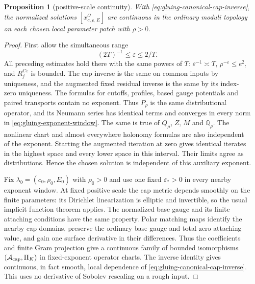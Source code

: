 \documentclass[11pt]{amsart}
\newtheorem{proposition}[theorem]{Proposition}
\theoremstyle{definition}
\theoremstyle{remark}
\theoremstyle{plain}
\begin{document}
\begin{proposition}[positive-scale continuity]\label{prop:gluing-parameter-continuity}
With \eqref{eq:gluing-canonical-cap-inverse}, the normalized solutions
$[x^{\mathcal O}_{c,\rho,E}]$ are continuous in the ordinary
moduli topology on each chosen local parameter patch with $\rho>0$.
\end{proposition}

\begin{proof}
First allow the simultaneous range
\begin{equation}\label{eq:gluing-exponent-window}
                      (2T)^{-1}\leq\varepsilon\leq2/T.
\end{equation}
All preceding estimates hold there with the same powers of $T$:
$\varepsilon^{-1}\asymp T$, $\rho^{-\varepsilon}\leq e^2$,
and $R_j^{C\varepsilon}$ is bounded. The cap inverse is the
same on common inputs by uniqueness, and the augmented fixed residual
inverse is the same by its index-zero uniqueness. The formulas for
cutoffs, profiles, based gauge potentials and paired transports contain
no exponent. Thus $P_\rho$ is the same distributional operator,
and its Neumann series has identical terms and converges in every
norm in \eqref{eq:gluing-exponent-window}. The same is true of
$Q_\rho$, $Z$, $M$ and $\mathbb Q_\rho$. The nonlinear
chart and almost everywhere holonomy formulas are also independent
of the exponent. Starting the augmented iteration at zero gives
identical iterates in the highest space and every lower space in
this interval. Their limits agree as distributions. Hence the chosen
solution is independent of this auxiliary exponent.

Fix $\lambda_0=(c_0,\rho_0,E_0)$ with $\rho_0>0$ and use
one fixed $\varepsilon_*>0$ in every nearby exponent window.
At fixed positive scale the cap metric depends smoothly on the finite
parameters: its Dirichlet linearization is elliptic and invertible,
so the usual implicit function theorem applies. The normalized base
gauge and its finite attaching conditions have the same property.
Polar matching maps identify the nearby cap domains, preserve the
ordinary base gauge and total zero attaching value, and gain one
surface derivative in their differences. Thus the coefficients and
finite Gram projection give a continuous family of bounded isomorphisms
$(\mathcal A_{\rm cap},\Pi_K)$ in fixed-exponent operator charts.
The inverse identity gives continuous, in fact smooth, local dependence
of \eqref{eq:gluing-canonical-cap-inverse}. This uses no derivative
of Sobolev rescaling on a rough input.


\end{proof}
\end{document}
